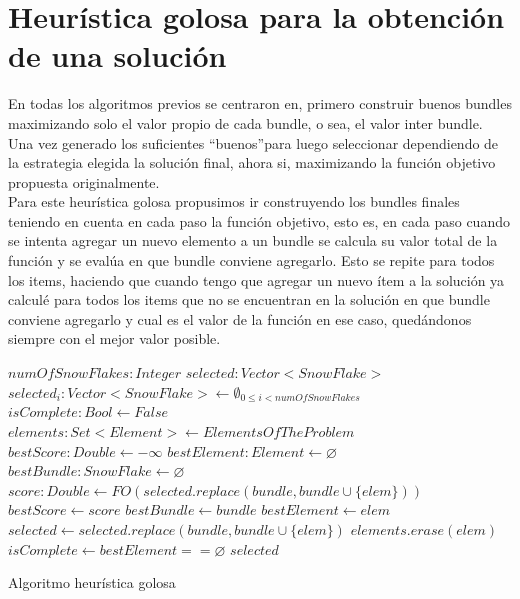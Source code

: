 \section{Heurística golosa para la obtención de una solución}
En todas los algoritmos previos se centraron en, primero construir buenos bundles maximizando solo 
el valor propio de cada bundle, o sea, el valor inter bundle. Una vez generado los suficientes 
\textquotedblleft buenos\textquotedblright  para luego seleccionar dependiendo de la 
estrategia elegida la solución final, ahora si, maximizando la función objetivo propuesta 
originalmente.\\
Para este heurística golosa propusimos ir construyendo los bundles finales teniendo en cuenta en 
cada paso la función objetivo, esto es, en cada paso cuando se intenta agregar un nuevo elemento a 
un bundle se calcula su valor total de la función y se evalúa en que bundle conviene agregarlo. 
Esto se repite para todos los items, haciendo que cuando tengo que agregar un nuevo ítem a la 
solución ya calculé para todos los items que no se encuentran en la solución en que bundle conviene 
agregarlo y cual es el valor de la función en ese caso, quedándonos siempre con el mejor valor 
posible.
\begin{algorithm}[H]
\begin{algorithmic}[1]
\REQUIRE $numOfSnowFlakes:Integer$
\ENSURE $selected:Vector<SnowFlake>$
\STATE $selected_{i}:Vector<SnowFlake> \leftarrow \emptyset_{0\leq i<numOfSnowFlakes}$
\STATE $isComplete:Bool \leftarrow False$
\STATE $elements:Set<Element> \leftarrow ElementsOfTheProblem$
\STATE $bestScore:Double \leftarrow -\infty$
\STATE $bestElement:Element \leftarrow \varnothing$
\STATE $bestBundle:SnowFlake \leftarrow \varnothing$
\STATE $score:Double \leftarrow FO(selected.replace(bundle, bundle \cup \{elem\}))$
\STATE $bestScore \leftarrow score$
\STATE $bestBundle \leftarrow bundle$
\STATE $bestElement \leftarrow elem$
\ENDIF
\ENDIF
\ENDFOR
\ENDFOR
\STATE $selected \leftarrow selected.replace(bundle, bundle \cup \{elem\})$
\STATE $elements.erase(elem)$
\STATE $isComplete \leftarrow bestElement == \varnothing$
\ENDWHILE
\RETURN $selected$
\end{algorithmic}
\caption{Algoritmo heurística golosa}\label{alg:algHeuGol}
\end{algorithm}
